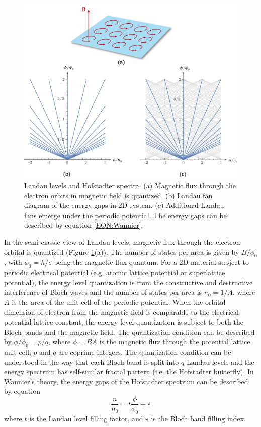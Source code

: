 \documentclass[pdflatex, sectionletters, 12pt]{pittetd}    %
\begin{document}
\begin{figure}[h!]
	\centering
	\includegraphics[width=1.0\textwidth]{Drawing/HofstadterLandau.pdf}
	\caption{Landau levels and Hofstadter spectra. (a) Magnetic flux through the electron orbits in magnetic field is quantized. (b) Landau fan diagram of the energy gaps in 2D system. (c) Additional Landau fans emerge under the periodic potential. The energy gaps can be described by equation \ref{EQN:Wannier}.}
	\label{FIG:HofstadterLandau}
\end{figure}

In the semi-classic view of Landau levels, magnetic flux through the electron orbital is quantized (Figure \ref{FIG:HofstadterLandau}(a)). The number of states per area is given by $B/\phi_0$, with $\phi_0 = h/e$ being the magnetic flux quantum. For a 2D material subject to periodic electrical potential (e.g. atomic lattice potential or superlattice potential), the energy level quantization is from the constructive and destructive interference of Bloch waves and the number of states per area is $n_0 = 1/A$, where $A$ is the area of the unit cell of the periodic potential. When the orbital dimension of electron from the magnetic field is comparable to the electrical potential lattice constant, the energy level quantization is subject to both the Bloch bands and the magnetic field. The quantization condition can be described by $\phi/\phi_0 = p/q$, where $\phi = BA$ is the magnetic flux through the potential lattice unit cell; $p$ and $q$ are coprime integers\cite{hofstadter1976energy}. The quantization condition can be understood in the way that each Bloch band is split into $q$ Landau levels and the energy spectrum has self-similar fractal pattern (i.e. the Hofstadter butterfly). In Wannier's theory\cite{wannier1978result}, the energy gaps of the Hofstadter spectrum can be described by equation 
\begin{equation}
\label{EQN:Wannier}
\frac{n}{n_0} = t\frac{\phi}{\phi_0} + s
\end{equation}
where $t$ is the Landau level filling factor, and $s$ is the Bloch band filling index\cite{streda1982quantised, thouless1984quantized}.  
\end{document}
